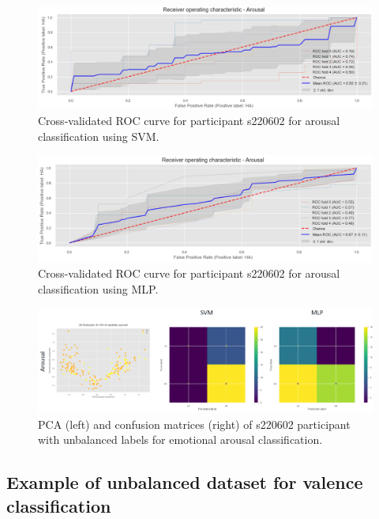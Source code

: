\begin{figure}[!htb]
\includegraphics[width=16cm]{img/appendix/arousal_unbalanced_roc_svm.png}
\centering
\caption{Cross-validated ROC curve for participant s220602 for arousal classification using SVM.}\label{fig:arousal_unbalanced_roc_svm}
\end{figure}

\begin{figure}[!htb]
\includegraphics[width=16cm]{img/appendix/arousal_unbalanced_roc_mlp.png}
\centering
\caption{Cross-validated ROC curve for participant s220602 for arousal classification using MLP.}\label{fig:arousal_unbalanced_roc_mlp}
\end{figure}

\begin{figure}[!htb]
\includegraphics[width=16cm]{img/appendix/arousal_unbalanced_pca_confusion.png}
\centering
\caption{PCA (left) and confusion matrices (right) of s220602 participant with unbalanced labels for emotional arousal 
classification.}\label{fig:arousal_unbalanced_pca_confusion}
\end{figure}

\subsection{Example of unbalanced dataset for valence classification}
\label{sec:appendix_A3.3.2}

